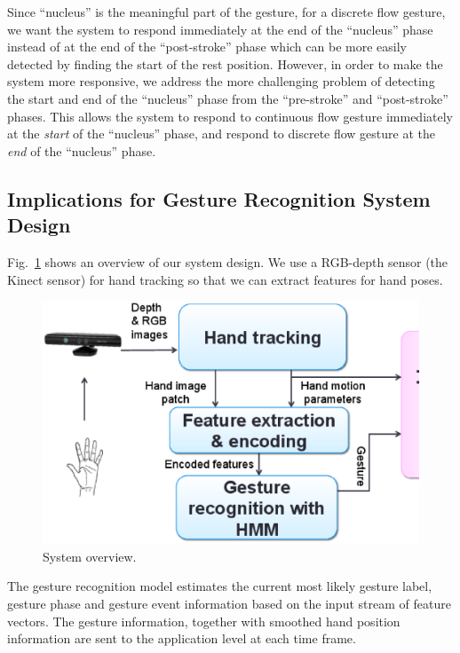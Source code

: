 \documentclass[conference]{IEEEtran}
\begin{document}
Since ``nucleus'' is the meaningful part of the gesture, for a discrete flow
gesture, we want the system to respond immediately at the end of the ``nucleus''
phase instead of at the end of the ``post-stroke'' phase which can be more
easily detected by finding the start of the rest position. However, in order to
make the system more responsive, we address the more challenging problem of
detecting the start and end of the ``nucleus'' phase from the ``pre-stroke''
and ``post-stroke'' phases. This allows the system to respond to continuous flow
gesture immediately at the \textit{start} of the ``nucleus'' phase, and respond
to discrete flow gesture at the \textit{end} of the ``nucleus'' phase.

\subsection{Implications for Gesture Recognition System Design}
Fig.~\ref{fig:system} shows an overview of our system design. We use a
RGB-depth sensor (the Kinect sensor) for hand tracking so that we can extract
features for hand poses.

\begin{figure}[!t]
\centering
\includegraphics[width=\columnwidth]{fig/system_overview.ps}
\caption{System overview.}
\label{fig:system}
\end{figure}

The gesture recognition model estimates the current most likely gesture label,
gesture phase and gesture event information based on the input stream of feature
vectors. The gesture information, 
together with smoothed hand position information are sent to the application level at each time frame.
\end{document}
